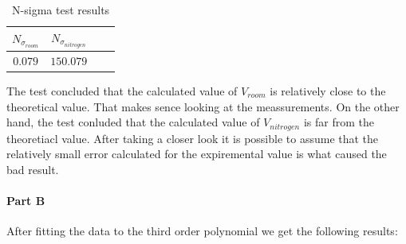 \documentclass[12pt,a4paper]{article}
\begin{document}
\begin{table}[htbp]
    \centering
    \label{Part A N-sigma test results}
    \begin{tabular}{@{}cccc@{}}
      \toprule
       $N_{\sigma_{room}} $& $N_{\sigma_{nitrogen}}$ \\
      \midrule
      $0.079$ & $150.079$ \\
      \bottomrule
    \end{tabular}
    \caption{N-sigma test results}

\end{table}
The test concluded that the calculated value of $V_{room}$ is relatively close to the theoretical value. That makes sence looking at the meassurements. 
On the other hand, the test conluded that the calculated value of $V_{nitrogen}$ is far from the theoretiacl value. After taking a closer look it is possible to assume that the relatively small error calculated for the expiremental value is what caused the bad result. 

\paragraph{Part B}
After fitting the data to the third order polynomial we get the following results:
\end{document}
